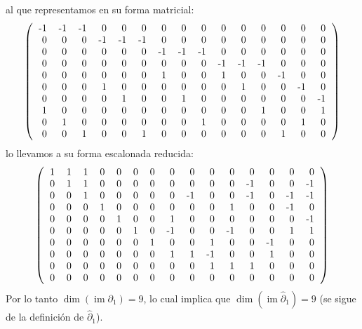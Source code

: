 \documentclass[12pt]{book}
\theoremstyle{definition}
\DeclareMathOperator{\im}{im}
\newcounter{in}
\newcounter{ini}
\begin{document}
al que representamos en su forma matricial:
\[ \left(
  \begin{tabular}{rrrrrrrrrrrrrrr}
    -1 & -1 & -1 & 0  & 0  & 0  & 0  & 0  & 0  & 0  & 0  & 0  & 0  & 0  & 0  \\
    0  & 0  & 0  & -1 & -1 & -1 & 0  & 0  & 0  & 0  & 0  & 0  & 0  & 0  & 0  \\
    0  & 0  & 0  & 0  & 0  & 0  & -1 & -1 & -1 & 0  & 0  & 0  & 0  & 0  & 0  \\
    0  & 0  & 0  & 0  & 0  & 0  & 0  & 0  & 0  & -1 & -1 & -1 & 0  & 0  & 0  \\
    0  & 0  & 0  & 0  & 0  & 0  & 1  & 0  & 0  & 1  & 0  & 0  & -1 & 0  & 0  \\
    0  & 0  & 0  & 1  & 0  & 0  & 0  & 0  & 0  & 0  & 1  & 0  & 0  & -1 & 0  \\
    0  & 0  & 0  & 0  & 1  & 0  & 0  & 1  & 0  & 0  & 0  & 0  & 0  & 0  & -1 \\
    1  & 0  & 0  & 0  & 0  & 0  & 0  & 0  & 0  & 0  & 0  & 1  & 0  & 0  & 1  \\
    0  & 1  & 0  & 0  & 0  & 0  & 0  & 0  & 1  & 0  & 0  & 0  & 0  & 1  & 0  \\
    0  & 0  & 1  & 0  & 0  & 1  & 0  & 0  & 0  & 0  & 0  & 0  & 1  & 0  & 0 
  \end{tabular}
\right)\] 
lo llevamos a su forma escalonada reducida:
\[ \left(
  \begin{tabular}{rrrrrrrrrrrrrrr}
    1 & 1 & 1 & 0 & 0 & 0 & 0 & 0  & 0  & 0  & 0  & 0  & 0  & 0  & 0  \\
    0 & 1 & 1 & 0 & 0 & 0 & 0 & 0  & 0  & 0  & 0  & -1 & 0  & 0  & -1 \\
    0 & 0 & 1 & 0 & 0 & 0 & 0 & 0  & -1 & 0  & 0  & -1 & 0  & -1 & -1 \\
    0 & 0 & 0 & 1 & 0 & 0 & 0 & 0  & 0  & 0  & 1  & 0  & 0  & -1 & 0  \\
    0 & 0 & 0 & 0 & 1 & 0 & 0 & 1  & 0  & 0  & 0  & 0  & 0  & 0  & -1 \\
    0 & 0 & 0 & 0 & 0 & 1 & 0 & -1 & 0  & 0  & -1 & 0  & 0  & 1  & 1  \\
    0 & 0 & 0 & 0 & 0 & 0 & 1 & 0  & 0  & 1  & 0  & 0  & -1 & 0  & 0  \\
    0 & 0 & 0 & 0 & 0 & 0 & 0 & 1  & 1  & -1 & 0  & 0  & 1  & 0  & 0  \\
    0 & 0 & 0 & 0 & 0 & 0 & 0 & 0  & 0  & 1  & 1  & 1  & 0  & 0  & 0  \\
    0 & 0 & 0 & 0 & 0 & 0 & 0 & 0  & 0  & 0  & 0  & 0  & 0  & 0  & 0 
  \end{tabular}
\right)\]
Por lo tanto $\dim(\im\partial_{1})=9$, lo cual implica que
$\dim(\im\widehat\partial_{1})=9$ (se sigue de la definición de
$\widehat\partial_{1}$).
\end{document}
